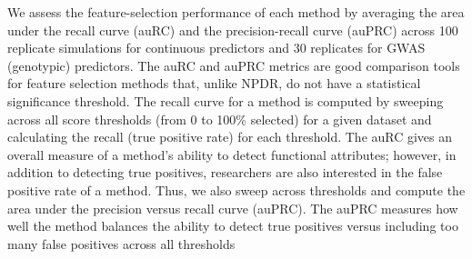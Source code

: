 \documentclass{bioinfo}
\begin{document}
We assess the feature-selection performance of each method by averaging the area under the recall curve (auRC) and the precision-recall curve (auPRC) across 100 replicate simulations for continuous predictors and 30 replicates for GWAS (genotypic) predictors.
The auRC and auPRC metrics are good comparison tools for feature selection methods that, unlike NPDR, do not have a statistical significance threshold.
The recall curve for a method is computed by sweeping across all score thresholds (from 0 to 100\% selected) for a given dataset and calculating the recall (true positive rate) for each threshold. The auRC gives an overall measure of a method's ability to detect functional attributes; however, in addition to detecting true positives, researchers are also interested in the false positive rate of a method. Thus, we also sweep across thresholds and compute the area under the precision versus recall curve (auPRC). The auPRC measures how well the method balances the ability to detect true positives versus including too many false positives across all thresholds
\end{document}
